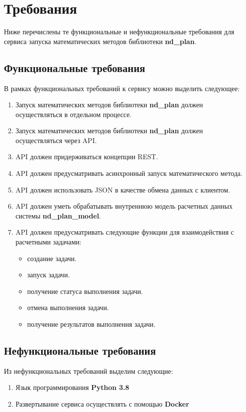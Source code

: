 \section*{\Large{Требования}}

Ниже перечислены те функциональные и нефункциональные требования
для сервиса запуска математических методов библиотеки \textbf{nd\_plan}.

\subsection*{\large{Функциональные требования}}

В рамках функциональных требований к сервису можно выделить следующее:
\begin{enumerate}
    \item Запуск математических методов библиотеки \textbf{nd\_plan} должен осуществляться в отдельном процессе.
    \item Запуск математических методов библиотеки \textbf{nd\_plan} должен осуществляться через API.
    \item API должен придерживаться концепции REST.
    \item API должен предусматривать асинхронный запуск математического метода.
    \item API должен использовать JSON в качестве обмена данных с клиентом.
    \item API должен уметь обрабатывать внутреннюю модель расчетных данных системы \textbf{nd\_plan\_model}.
    \item API должен предусматривать следующие функции для взаимодействия с расчетными задачами:
    \begin{itemize}
        \item создание задачи.
        \item запуск задачи.
        \item получение статуса выполнения задачи.
        \item отмена выполнения задачи.
        \item получение результатов выполнения задачи.
    \end{itemize}
\end{enumerate}

\subsection*{\large{Нефункциональные требования}}

Из нефункциональных требований выделим следующие:
\begin{enumerate}
    \item Язык программирования \textbf{Python 3.8}
    \item Развертывание сервиса осуществлять с помощью \textbf{Docker}
\end{enumerate}
